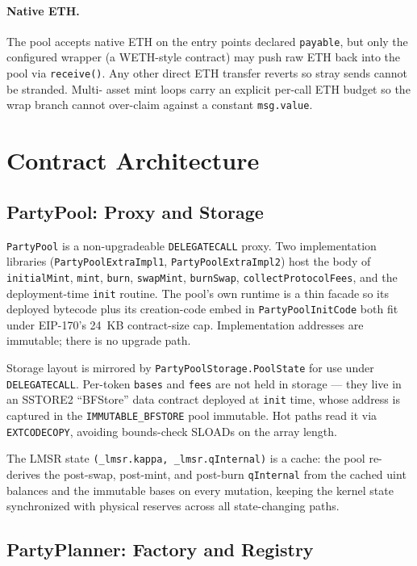 \documentclass[11pt]{article}
\begin{document}
\paragraph{Native ETH.} The pool accepts native ETH on the entry points
declared \texttt{payable}, but only the configured wrapper (a WETH-style
contract) may push raw ETH back into the pool via \texttt{receive()}. Any
other direct ETH transfer reverts so stray sends cannot be stranded. Multi-
asset mint loops carry an explicit per-call ETH budget so the wrap branch
cannot over-claim against a constant \texttt{msg.value}.

\section{Contract Architecture}
\label{sec:arch}

\subsection{PartyPool: Proxy and Storage}

\texttt{PartyPool} is a non-upgradeable \texttt{DELEGATECALL} proxy.
Two implementation libraries (\texttt{PartyPoolExtraImpl1},
\texttt{PartyPoolExtraImpl2}) host the body of \texttt{initialMint},
\texttt{mint}, \texttt{burn}, \texttt{swapMint}, \texttt{burnSwap},
\texttt{collectProtocolFees}, and the deployment-time
\texttt{init} routine. The pool's own runtime is a thin facade so its
deployed bytecode plus its creation-code embed in
\texttt{PartyPoolInitCode} both fit under EIP-170's 24~KB
contract-size cap. Implementation addresses are immutable; there is no
upgrade path.

Storage layout is mirrored by \texttt{PartyPoolStorage.PoolState} for use
under \texttt{DELEGATECALL}. Per-token \texttt{bases} and \texttt{fees} are
not held in storage --- they live in an SSTORE2 ``BFStore'' data contract
deployed at \texttt{init} time, whose address is captured in the
\texttt{IMMUTABLE\_BFSTORE} pool immutable. Hot paths read it via
\texttt{EXTCODECOPY}, avoiding bounds-check SLOADs on the array length.

The LMSR state \texttt{(\_lmsr.kappa, \_lmsr.qInternal)} is a cache: the
pool re-derives the post-swap, post-mint, and post-burn \texttt{qInternal}
from the cached uint balances and the immutable bases on every mutation,
keeping the kernel state synchronized with physical reserves across all
state-changing paths.

\subsection{PartyPlanner: Factory and Registry}
\end{document}
